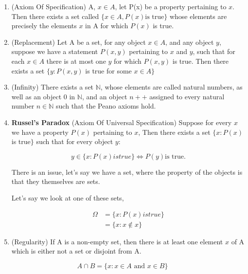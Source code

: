 \documentclass[11pt]{report}
\begin{document}
\begin{enumerate}
\begin{proof}
		      The two statements are equivalent.
	      \end{proof}
	\item (Axiom Of Specification) A, $x \in A$, let P(x) be a property pertaining to $x$. Then there exists a set called $\{x \in A, P(x) \text{is true}\}$ whose elements are precisely the elements $x$ in A for which $P(x)$ is true.
	\item (Replacement) Let A be a set, for any object $x \in A$, and any object $y$, suppose we have a statement $P(x,y)$ pertaining to $x$ and $y$, such that for each $x \in A$ there is at most one $y$ for which $P(x,y)$ is true. Then there exists a set $\{y : P(x,y)$ is true for some $x \in A\}$
	\item (Infinity) There exists a set $\mathbb{N}$, whose elements are called natural numbers, as well as an object $0$ in $\mathbb{N}$, and an object $n++$ assigned to every natural number $n \in \mathbb{N}$ such that the Peano axioms hold.

	\item \textbf{Russel's Paradox} (Axiom Of Universal Specification) Suppose for every $x$ we have a property $P(x)$ pertaining to $x$, Then there exists a set $\{x : P(x)$ is true$\}$ such that for every object $y$:

	      $$ y \in \{ x : P(x) is true \} \Leftrightarrow P(y) \text{is true.}$$

	      There is an issue, let's say we have a set, where the property of the objects is that they themselves are sets.

	      Let's say we look at one of these sets,

	      \begin{align*}
		      \Omega & = \{ x: P(x) is true\} \\
		             & = \{x : x \notin x \}
	      \end{align*}

	\item (Regularity) If A is a  non-empty set, then there is at least one element $x$ of A which is either not a set or disjoint from A.
\end{enumerate}
\begin{definition}
	$$A \cap B = \{x: x \in A \text{ and } x \in B \}$$
\end{definition}
\end{document}
